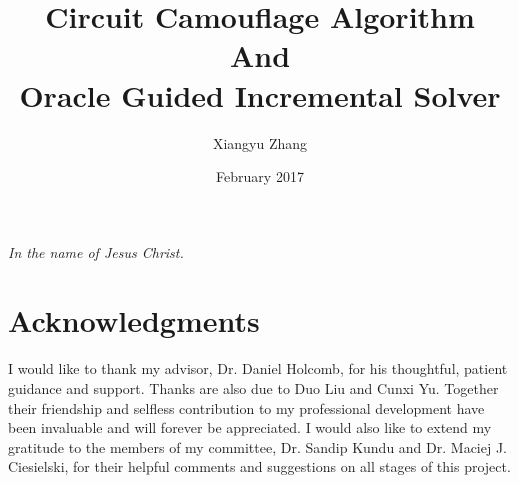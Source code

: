 \documentclass[proposal]{umassthesis}  %
\begin{document}
\title{Circuit Camouflage Algorithm\protect\\And\protect\\Oracle Guided Incremental Solver}
\author{Xiangyu Zhang}
\date{February 2017} %




\frontmatter
\maketitle
\signaturepage

\begin{dedication}              %
  \begin{center}
    \emph{In the name of Jesus Christ.}
  \end{center}
\end{dedication}


%
%
\chapter{Acknowledgments}             %
I would like to thank my advisor, Dr. Daniel Holcomb, for his thoughtful, patient guidance and support. Thanks are also due to Duo Liu and Cunxi Yu. Together their friendship and selfless contribution to my professional development have been invaluable and will forever be appreciated. I would also like to extend my gratitude to the members of my committee, Dr. Sandip Kundu and Dr. Maciej J. Ciesielski, for their helpful comments and suggestions on all stages of this project.\\
\end{document}
